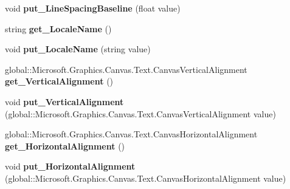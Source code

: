 \begin{DoxyCompactItemize}
void {\bfseries put\+\_\+\+Line\+Spacing\+Baseline} (float value)
\item 
\mbox{\label{interface_microsoft_1_1_graphics_1_1_canvas_1_1_text_1_1_i_canvas_text_format_a9fbcf60a43f2e17aeac3b52f0ae5e4a2}} 
string {\bfseries get\+\_\+\+Locale\+Name} ()
\item 
\mbox{\label{interface_microsoft_1_1_graphics_1_1_canvas_1_1_text_1_1_i_canvas_text_format_ab29c7707ce1512d0532907fed423fe67}} 
void {\bfseries put\+\_\+\+Locale\+Name} (string value)
\item 
\mbox{\label{interface_microsoft_1_1_graphics_1_1_canvas_1_1_text_1_1_i_canvas_text_format_a46bed4e8bb37c20382588d22721561df}} 
global\+::\+Microsoft.\+Graphics.\+Canvas.\+Text.\+Canvas\+Vertical\+Alignment {\bfseries get\+\_\+\+Vertical\+Alignment} ()
\item 
\mbox{\label{interface_microsoft_1_1_graphics_1_1_canvas_1_1_text_1_1_i_canvas_text_format_a47eeac343ee56e937ea663d034a43e3f}} 
void {\bfseries put\+\_\+\+Vertical\+Alignment} (global\+::\+Microsoft.\+Graphics.\+Canvas.\+Text.\+Canvas\+Vertical\+Alignment value)
\item 
\mbox{\label{interface_microsoft_1_1_graphics_1_1_canvas_1_1_text_1_1_i_canvas_text_format_a8b95906a63861d6e560977db8b154cb6}} 
global\+::\+Microsoft.\+Graphics.\+Canvas.\+Text.\+Canvas\+Horizontal\+Alignment {\bfseries get\+\_\+\+Horizontal\+Alignment} ()
\item 
\mbox{\label{interface_microsoft_1_1_graphics_1_1_canvas_1_1_text_1_1_i_canvas_text_format_aa35da0e8e55810f44b20d72a857dc479}} 
void {\bfseries put\+\_\+\+Horizontal\+Alignment} (global\+::\+Microsoft.\+Graphics.\+Canvas.\+Text.\+Canvas\+Horizontal\+Alignment value)
\item 
\mbox{\label{interface_microsoft_1_1_graphics_1_1_canvas_1_1_text_1_1_i_canvas_text_format_a2db054de408def815030a08cc7d260fb}} 

\end{DoxyCompactItemize}
